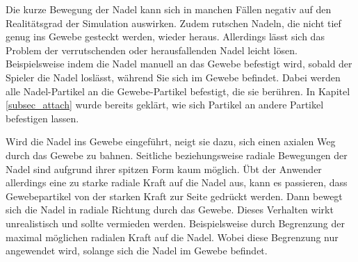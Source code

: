 Die kurze Bewegung der Nadel kann sich in manchen Fällen negativ auf den Realitätsgrad der Simulation auswirken. Zudem rutschen Nadeln, die nicht tief genug ins Gewebe gesteckt werden, wieder heraus. Allerdings lässt sich das Problem der verrutschenden oder herausfallenden Nadel leicht lösen. Beispielsweise indem die Nadel manuell an das Gewebe befestigt wird, sobald der Spieler die Nadel loslässt, während Sie sich im Gewebe befindet. Dabei werden alle Nadel-Partikel an die Gewebe-Partikel befestigt, die sie berühren. In Kapitel \ref{subsec_attach} wurde bereits geklärt, wie sich Partikel an andere Partikel befestigen lassen. 

Wird die Nadel ins Gewebe eingeführt, neigt sie dazu, sich einen axialen Weg durch das Gewebe zu bahnen. Seitliche beziehungsweise radiale Bewegungen der Nadel sind aufgrund ihrer spitzen Form kaum möglich. Übt der Anwender allerdings eine zu starke radiale Kraft auf die Nadel aus, kann es passieren, dass Gewebepartikel von der starken Kraft zur Seite gedrückt werden. Dann bewegt sich die Nadel in radiale Richtung durch das Gewebe. Dieses Verhalten wirkt unrealistisch und sollte vermieden werden. Beispielsweise durch Begrenzung der maximal möglichen radialen Kraft auf die Nadel. Wobei diese Begrenzung nur angewendet wird, solange sich die Nadel im Gewebe befindet.

% 

%

